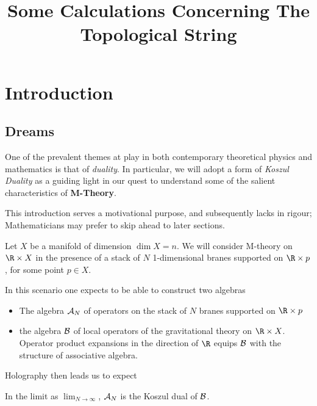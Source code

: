\documentclass[12pt]{amsart}
\title{Some Calculations Concerning The Topological String}
\begin{document}

  
  \maketitle
  \tableofcontents
  \mbox{}

\section{Introduction}

\subsection{Dreams}
  One of the prevalent themes at play in both contemporary theoretical physics
  and mathematics is that of \textit{duality}. In particular, we will adopt a
  form of \textit{Koszul Duality} as a guiding light in our quest to understand
  some of the salient characteristics of \textbf{M-Theory}.\par

  \begin{rmk}
    This introduction serves a motivational purpose, and subsequently lacks in
    rigour; Mathematicians may prefer to skip ahead to later sections.
  \end{rmk}

  Let $X$ be a manifold of dimension $\dim X = n$. We will consider
  M-theory on $\R \times X$ in the presence of a stack of $N$ 1-dimensional
  branes supported
  on $\R \times p$, for some point $p \in X$.

  In this scenario one expects to be able to construct two algebras

  \begin{itemize}
    \item The algebra $\mathcal{A}_N$ of operators on the stack of $N$ branes supported
      on $\R \times p$
    \item the algebra $\mathcal{B}$ of local operators of the gravitational theory
      on $\R \times X$. Operator product expansions in the direction of $\R$ equips $\mathcal{B}$ with the
  structure of associative algebra.
  \end{itemize}

  Holography then leads us to expect
  \begin{conj}
    In the limit as $\lim_{N \rightarrow \infty}$, $\mathcal{A}_N$ is the Koszul
    dual of $\mathcal{B}$.
  \end{conj}
\end{document}
